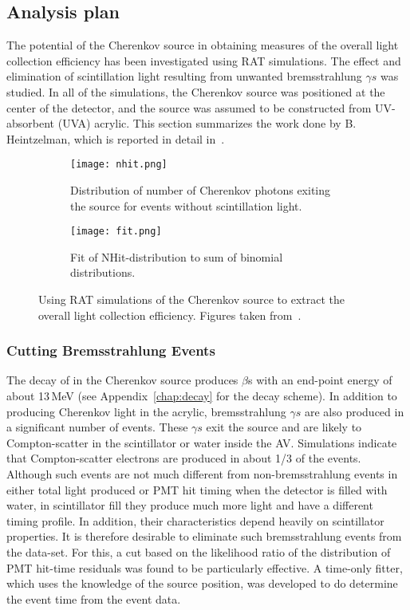 \subsection{Analysis plan}
The potential of the Cherenkov source in obtaining measures of the overall light collection efficiency has been investigated using RAT simulations. The effect and elimination of scintillation light resulting from unwanted bremsstrahlung $\gamma s$  was studied.  In all of the simulations, the Cherenkov source was positioned at the center of the detector, and the source
was assumed to be constructed from UV-absorbent (UVA) acrylic. This section summarizes the work done by B. Heintzelman, which is reported in detail in~\cite{Heintzelman:2013}.
 
 \begin{figure}
 \begin{subfigure}{.48\textwidth}
   \texttt{[image: nhit.png]}
   \caption{Distribution of number of Cherenkov photons exiting the source for events without scintillation light.}
   \label{fig:nphotons}
 \end{subfigure}
 \hspace{0.5cm}
 \begin{subfigure}{.48\textwidth}
   \texttt{[image: fit.png]}
   \caption{Fit of NHit-distribution to sum of binomial distributions.}
   \label{fig:fit}
 \end{subfigure}
 \caption{Using RAT simulations of the Cherenkov source to extract the overall light collection efficiency. Figures taken from~\cite{Heintzelman:2013}. }
 \label{fig:heintzelman-plots}
 \end{figure}
 
\subsubsection{Cutting Bremsstrahlung Events}
The decay of \Li in the Cherenkov source produces $\beta$s with an end-point energy of about 13\,MeV (see Appendix~\ref{chap:decay} for the decay scheme). In addition to producing Cherenkov light in the acrylic, bremsstrahlung $\gamma s$ are also produced in a significant number of events.  These $\gamma s$  exit the source and are likely to Compton-scatter in the scintillator or water inside the AV.  Simulations indicate that Compton-scatter electrons are produced in about 1/3 of the events.  Although such events are not much different from non-bremsstrahlung events in either total light produced or PMT hit timing when the detector is filled with water, in scintillator fill they produce much more light and have a different timing profile.  In addition, their characteristics depend heavily on scintillator properties. It is therefore desirable to eliminate such bremsstrahlung events from the data-set. For this, a cut based on the likelihood ratio of the distribution of PMT hit-time residuals was found to be particularly effective. A time-only fitter, which uses the knowledge of the source position, was developed to do determine the event time from the event data.

